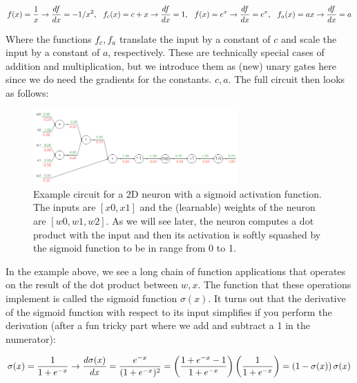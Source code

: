 \begin{equation}
f(x) = \frac{1}{x} 
 \rightarrow 
\frac{df}{dx} = -1/x^2 ,
\\\\
\hspace{0.1in}f_c(x) = c + x
 \rightarrow  
\frac{df}{dx} = 1,
\\\\
\hspace{0.1in}f(x) = e^x
 \rightarrow 
\frac{df}{dx} = e^x,
\\\\
\hspace{0.1in}f_a(x) = ax
 \rightarrow  
\frac{df}{dx} = a
\end{equation}

Where the functions $f_c,f_a$ translate the input by a constant of $c$ and scale the input by a constant of $a$, respectively. These are technically special cases of addition and multiplication, but we introduce them as (new) unary gates here since we do need the gradients for the constants. $c,a$. The full circuit then looks as follows:

\begin{figure}[h]
  \centering
  \includegraphics[width=0.7\textwidth]{Images/backprop/3.png}
  \caption{Example circuit for a 2D neuron with a sigmoid activation function. The inputs are $[x0,x1]$ and the (learnable) weights of the neuron are $[w0,w1,w2]$. As we will see later, the neuron computes a dot product with the input and then its activation is softly squashed by the sigmoid function to be in range from 0 to 1.}
\end{figure}

In the example above, we see a long chain of function applications that operates on the result of the dot product between $w,x$. The function that these operations implement is called the sigmoid function $\sigma(x)$. It turns out that the derivative of the sigmoid function with respect to its input simplifies if you perform the derivation (after a fun tricky part where we add and subtract a 1 in the numerator):

\begin{equation}
\sigma(x) = \frac{1}{1+e^{-x}} \\\\
\rightarrow \frac{d\sigma(x)}{dx} = \frac{e^{-x}}{(1+e^{-x})^2} = \left( \frac{1 + e^{-x} - 1}{1 + e^{-x}} \right) \left( \frac{1}{1+e^{-x}} \right) 
= \left( 1 - \sigma(x) \right) \sigma(x)
\end{equation}

